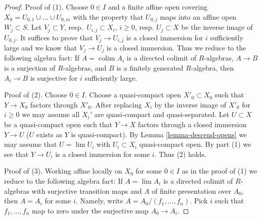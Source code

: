 \documentclass[10pt,a4paper]{amsart}
\theoremstyle{plain}
\theoremstyle{definition}
\theoremstyle{remark}
\numberwithin{equation}{subsection}
\def\lim{\mathop{\mathrm{lim}}\nolimits}
\def\colim{\mathop{\mathrm{colim}}\nolimits}
\begin{document}
\begin{proof}
Proof of (1). Choose $0 \in I$ and a finite affine open covering
$X_0 = U_{0, 1} \cup \ldots \cup U_{0, m}$ with the property that
$U_{0, j}$ maps into an affine open $W_j \subset S$.
Let $V_j \subset Y$, resp.\ $U_{i, j} \subset X_i$, $i \geq 0$,
resp. $U_j \subset X$ be the inverse image of $U_{0, j}$. It suffices
to prove that $V_j \to U_{i, j}$ is a closed immersion for $i$
sufficiently large and we know that $V_j \to U_j$ is a closed immersion.
Thus we reduce to the following algebra fact: If $A = \colim A_i$ is a
directed colimit of $R$-algebras, $A \to B$ is a surjection of $R$-algebras,
and $B$ is a finitely generated $R$-algebra, then
$A_i \to B$ is surjective for $i$ sufficiently large.

\medskip\noindent
Proof of (2). Choose $0 \in I$. Choose a quasi-compact open
$X'_0 \subset X_0$ such that $Y \to X_0$ factors through $X'_0$.
After replacing $X_i$ by the inverse image of $X'_0$ for $i \geq 0$
we may assume all $X_i'$ are quasi-compact and quasi-separated.
Let $U \subset X$ be a quasi-compact open such that $Y \to X$ factors
through a closed immersion $Y \to U$ ($U$ exists as $Y$ is quasi-compact). By
Lemma \ref{lemma-descend-opens}
we may assume that $U = \lim U_i$ with $U_i \subset X_i$ quasi-compact
open. By part (1) we see that $Y \to U_i$ is a closed immersion for some
$i$. Thus (2) holds.

\medskip\noindent
Proof of (3). Working affine locally on $X_0$ for some $0 \in I$ as in
the proof of (1) we reduce to the following algebra fact: If $A = \lim A_i$
is a directed colimit of $R$-algebras with surjective transition
maps and $A$ of finite presentation over $A_0$, then $A = A_i$ for
some $i$. Namely, write $A = A_0/(f_1, \ldots, f_n)$. Pick $i$ such
that $f_1, \ldots, f_n$ map to zero under the surjective map $A_0 \to A_i$.
\end{proof}
\end{document}
